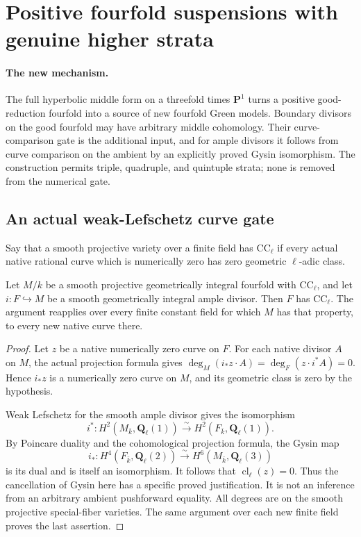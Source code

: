 \section{Positive fourfold suspensions with genuine higher strata}
\label{r22su:section}

\paragraph{The new mechanism.}
The full hyperbolic middle form on a threefold times $\mathbf P^1$
turns a positive good-reduction fourfold into a source of new
fourfold Green models.  Boundary divisors on the good fourfold
may have arbitrary middle cohomology.  Their curve-comparison
gate is the additional input, and for ample divisors it follows
from curve comparison on the ambient by an explicitly proved
Gysin isomorphism.  The construction permits triple, quadruple,
and quintuple strata; none is removed from the numerical gate.

\subsection{An actual weak-Lefschetz curve gate}

Say that a smooth projective variety over a finite field has
$\mathrm{CC}_\ell$ if every actual native rational curve which
is numerically zero has zero geometric $\ell$-adic class.

\begin{lemma}
\label{r22su:ampleCC}
Let $M/k$ be a smooth projective geometrically integral fourfold
with $\mathrm{CC}_\ell$, and let $i:F\hookrightarrow M$ be a
smooth geometrically integral ample divisor.  Then $F$ has
$\mathrm{CC}_\ell$.  The argument reapplies over every finite
constant field for which $M$ has that property, to every new
native curve there.
\end{lemma}

\begin{proof}
Let $z$ be a native numerically zero curve on $F$.  For each
native divisor $A$ on $M$, the actual projection formula gives
$\deg_M(i_*z\cdot A)=\deg_F(z\cdot i^*A)=0$.  Hence $i_*z$
is a numerically zero curve on $M$, and its geometric class is
zero by the hypothesis.

Weak Lefschetz for the smooth ample divisor gives the isomorphism
\[
 i^*:H^2(M_{\bar k},\mathbf Q_\ell(1))
                  \xrightarrow{\sim}H^2(F_{\bar k},\mathbf Q_\ell(1)).
 \tag{SU22.1}\label{r22su:weakL}
\]
By Poincare duality and the cohomological projection formula,
the Gysin map
\[
 i_*:H^4(F_{\bar k},\mathbf Q_\ell(2))
                  \xrightarrow{\sim}H^6(M_{\bar k},\mathbf Q_\ell(3))
 \tag{SU22.2}\label{r22su:Gysiniso}
\]
is its dual and is itself an isomorphism.  It follows that
$\operatorname{cl}_\ell(z)=0$.  Thus the cancellation of Gysin
here has a specific proved justification.  It is not an inference
from an arbitrary ambient pushforward equality.  All degrees are
on the smooth projective special-fiber varieties.  The same
argument over each new finite field proves the last assertion.
\end{proof}


